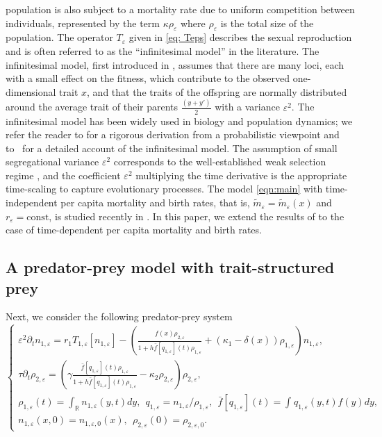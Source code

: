 \documentclass[]{article}
\theoremstyle{remark}
\begin{document}
population is also subject to a mortality rate due to uniform competition between individuals, represented by the term $\kappa \rho_\varepsilon$  where $\rho_\varepsilon$ is the total size of the population. The operator $T_\varepsilon$ given in \eqref{eq: Teps} describes the sexual reproduction and is often referred to as the “infinitesimal model” in the literature. The infinitesimal model, first introduced in \cite{fisher1919xv}, assumes that there are many loci, each with a small effect on the fitness, which contribute to the observed one-dimensional trait $x$, and that the traits of the offspring are normally distributed around the average trait of their parents $\frac{(y+y')}{2}$ with a variance $\varepsilon^2$. The infinitesimal model has been widely used in biology and population dynamics; we refer the reader to \cite{barton2017infinitesimal} for a rigorous derivation from a probabilistic viewpoint and to~\cite{turelli2017commentary} for a detailed account of the infinitesimal model. The assumption of small segregational variance $\varepsilon^2$ corresponds to the well-established weak selection regime \cite{burger2000mathematical}, and the coefficient $\varepsilon^2$ multiplying the time derivative is the appropriate time-scaling to capture evolutionary processes. The model \eqref{eqn:main} with time-independent per capita mortality and birth rates, that is, $\tilde{m}_\varepsilon=\tilde{m}_\varepsilon(x)$ and $r_\varepsilon=\mathrm{const}$, is studied recently in \cite{GHM}. In this paper, we extend the results of \cite{GHM} to the case of time-dependent per capita mortality and birth rates.   
\subsection*{A predator-prey model with trait-structured prey}
Next, we consider the following predator-prey system 
\begin{equation} \label{eqn:evolving_prey}
\begin{cases}
\varepsilon^2 \partial_t   n_{1,\varepsilon}= r_1T_{{1,\varepsilon}}  [ n_{1,\varepsilon}]  
-   \left(\frac{f(x)\rho_{2,\varepsilon}}{1+h\bar{f}[q_{1,\varepsilon}](t)\rho_{1,\varepsilon}}  + (\kappa_1-\delta(x)) \rho_{1,\varepsilon} \right) n_{1,\varepsilon} ,\\
\tau \partial_t   \rho_{2,\varepsilon}= \left(\gamma{}\frac{\bar{f}[q_{1,\varepsilon}](t)\rho_{1,\varepsilon}}{1+h\bar{f}[q_{1,\varepsilon}](t)\rho_{1,\varepsilon}} -\kappa_2\rho_{2,\varepsilon}\right)\rho_{2,\varepsilon},\\
\rho_{1,\varepsilon}(t)= \int_{\mathbb R}   n_{1,\varepsilon}(y,t)dy,~~q_{1,\varepsilon}=n_{1,\varepsilon}/\rho_{1,\varepsilon},~~\bar{f}[q_{1,\varepsilon}](t)=\int_{}q_{1,\varepsilon}(y,t)f(y)dy,\\
n_{1,\varepsilon}(x,0)=n_{{1,\varepsilon},0}(x), ~~\rho_{2,\varepsilon}(0)=\rho_{2,\varepsilon,0}.
\end{cases}
\end{equation}
\end{document}
